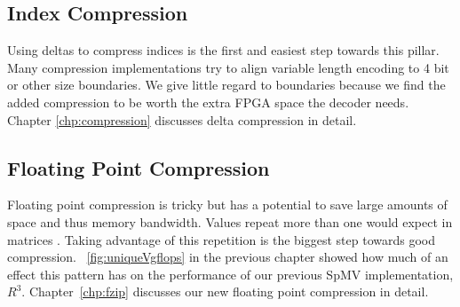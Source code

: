 \subsection{Index Compression}
\par Using deltas to compress indices is the first and easiest step towards this pillar. Many compression implementations try to align variable length encoding to 4 bit or other size boundaries. We give little regard to boundaries because we find the added compression to be worth the extra FPGA space the decoder needs. Chapter \ref{chp:compression} discusses delta compression in detail.
%
\subsection{Floating Point Compression}
\par Floating point compression is tricky but has a potential to save large amounts of space and thus memory bandwidth. Values repeat more than one would expect in matrices \cite{prelim:kourtis}. Taking advantage of this repetition is the biggest step towards good compression. \figurename~\ref{fig:uniqueVgflops} in the previous chapter showed how much of an effect this pattern has on the performance of our previous SpMV implementation, $R^3$. Chapter~\ref{chp:fzip} discusses our new floating point compression in detail.

